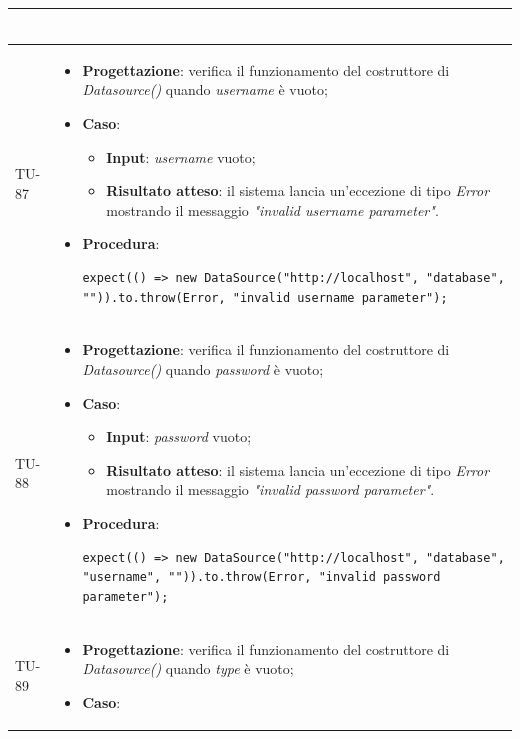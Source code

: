 \begin{longtable}{|C{1.5cm}|C{14.5cm}|}
\begin{itemize}
\begin{lstlisting}
	\end{lstlisting}
\end{itemize}\\
\hline
{TU-87} &
\begin{itemize}
	\item \textbf{Progettazione}: verifica il funzionamento del costruttore di \emph{Datasource()} quando \emph{username} è vuoto;
	\item \textbf{Caso}: 
	\begin{itemize}
		\item \textbf{Input}: \emph{username} vuoto;
		\item \textbf{Risultato atteso}: il sistema lancia un'eccezione di tipo \emph{Error} mostrando il messaggio \emph{"invalid username parameter"}.
	\end{itemize}
	\item \textbf{Procedura}:
	\begin{lstlisting}
expect(() => new DataSource("http://localhost", "database", "")).to.throw(Error, "invalid username parameter");
	\end{lstlisting}
\end{itemize}\\
\hline
{TU-88} &
\begin{itemize}
	\item \textbf{Progettazione}: verifica il funzionamento del costruttore di \emph{Datasource()} quando \emph{password} è vuoto;
	\item \textbf{Caso}: 
	\begin{itemize}
		\item \textbf{Input}: \emph{password} vuoto;
		\item \textbf{Risultato atteso}: il sistema lancia un'eccezione di tipo \emph{Error} mostrando il messaggio \emph{"invalid password parameter"}.
	\end{itemize}
	\item \textbf{Procedura}:
	\begin{lstlisting}
expect(() => new DataSource("http://localhost", "database", "username", "")).to.throw(Error, "invalid password parameter");
	\end{lstlisting}
\end{itemize}\\
\hline
{TU-89} &
\begin{itemize}
	\item \textbf{Progettazione}: verifica il funzionamento del costruttore di \emph{Datasource()} quando \emph{type} è vuoto;
	\item \textbf{Caso}: 

\end{itemize}
\end{longtable}
